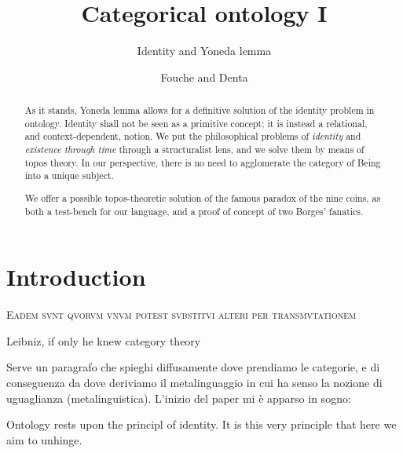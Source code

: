 \documentclass{amsart}
\author{Fouche and Denta}
\title{Categorical ontology I}
\subtitle{Identity and Yoneda lemma}
\begin{document}
\maketitle
\begin{abstract}
  As it stands, Yoneda lemma allows for a definitive solution of the identity problem in ontology. Identity shall not be seen as a primitive concept; it is instead a relational, and context-dependent, notion. We put the philosophical problems of \emph{identity} and \emph{existence through time} through a structuralist lens, and we solve them by means of topos theory. In our perspective, there is no need to agglomerate the category of Being into a unique subject.
  
  We offer a possible topos-theoretic solution of the famous paradox of the nine coins, as both a test-bench for our language, and a proof of concept of two Borges' fanatics.
\end{abstract}
\section{Introduction}
\epigraph{\textsc{Eadem svnt qvorvm vnvm potest svbstitvi alteri per transmvtationem}}{Leibniz, if only he knew category theory}
Serve un paragrafo che spieghi diffusamente dove prendiamo le categorie, e di conseguenza da dove deriviamo il metalinguaggio in cui ha senso la nozione di uguaglianza (metalinguistica). L'inizio del paper mi è apparso in sogno:

Ontology rests upon the principl of identity. It is this very principle that here we aim to unhinge.
\end{document}
